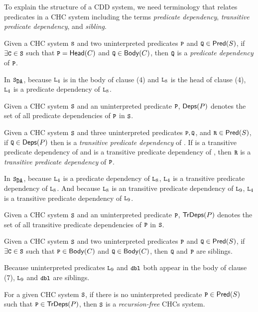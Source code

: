 To explain the structure of a CDD system, we need terminology that relates
predicates in a CHC system including the terms \emph{predicate dependency},
\emph{transitive predicate dependency}, and \emph{sibling}.
\begin{defn}
  Given a CHC system $\cc{S}$ and two uninterpreted predicates
  $\cc{P}$ and $\cc{Q} \in \predof{S}$, if $\exists \cc{C} \in \cc{S}$
  such that $\cc{P} = \headof{C}$ and $\cc{Q} \in \bodyof{C}$, then
  $\cc{Q}$ is a \emph{predicate dependency} of $\cc{P}$.
\end{defn}
%
\begin{ex}
  In $\mcchc$, because $\cc{L}_4$ is in the body of clause (4) and
  $\cc{L}_8$ is the head of clause (4), $\cc{L}_4$ is a predicate
  dependency of $\cc{L}_8$.
\end{ex}
%
Given a CHC system $\cc{S}$ and an uninterpreted predicate $\cc{P}$,
$\mathsf{Deps}(P)$ denotes the set of all predicate dependencies of $\cc{P}$
in $\cc{S}$.
%
\begin{defn}
  Given a CHC system $\cc{S}$ and three uninterpreted predicates
  $\cc{P}, \cc{Q}$, and $\cc{R} \in \predof{S}$, if $\cc{Q} \in
  \depsof{P}$ then  is a \emph{transitive predicate dependency} of
  .
  If  is a transitive predicate dependency of  and 
  is a transitive predicate dependency of , then $\cc{R}$ is a
  \emph{transitive predicate dependency} of $\cc{P}$.
\end{defn}
%
\begin{ex}
  In $\mcchc$, because $\cc{L}_4$ is a predicate dependency of
  $\cc{L}_8$, $\cc{L}_4$ is a transitive predicate dependency of
  $\cc{L}_8$.
  And because $\cc{L}_8$ is an transitive predicate dependency of
  $\cc{L}_9$, $\cc{L}_4$ is a transitive predicate dependency of
  $\cc{L}_9$.
\end{ex}
%
Given a CHC system $\cc{S}$ and an uninterpreted predicate $\cc{P}$,
$\mathsf{TrDeps}(P)$ denotes the set of all transitive predicate dependencies
of $\cc{P}$ in $\cc{S}$.
%
\begin{defn}
  Given a CHC system $\cc{S}$ and two uninterpreted predicates
  $\cc{P}$ and $\cc{Q} \in \predof{S}$, if $\exists \cc{C} \in \cc{S}$
  such that $\cc{P} \in \bodyof{C}$ and $\cc{Q} \in \bodyof{C}$, then
  $\cc{Q}$ and $\cc{P}$ are siblings.
\end{defn}
%
\begin{ex}
  Because uninterpreted predicates $\cc{L}_9$ and $\cc{dbl}$ both
  appear in the body of clause (7), $\cc{L}_9$ and $\cc{dbl}$ are
  siblings.
\end{ex}
%
%
For a given CHC system $\cc{S}$, if there is no uninterpreted
predicate $\cc{P} \in \predof{S}$ such that $\cc{P} \in \tdepsof{P}$,
then $\cc{S}$ is a \emph{recursion-free} CHCs system.
%

